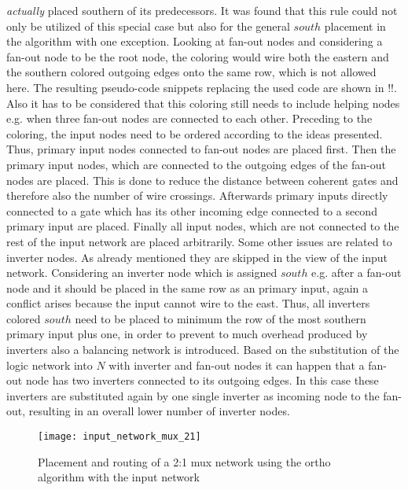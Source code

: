 \textit{actually} placed southern of its predecessors. It was found that this rule could not only be utilized of this special case but also for the general $south$ placement in the algorithm with one exception. Looking at fan-out nodes and considering a fan-out node to be the root node, the coloring would wire both the eastern and the southern colored outgoing edges onto the same row, which is not allowed here. The resulting pseudo-code snippets replacing the used code are shown in !!. Also it has to be considered that this coloring still needs to include helping nodes e.g. when three fan-out nodes are connected to each other. Preceding to the coloring, the input nodes need to be ordered according to the ideas presented. Thus, primary input nodes connected to fan-out nodes are placed first. Then the primary input nodes, which are connected to the outgoing edges of the fan-out nodes are placed. This is done to reduce the distance between coherent gates and therefore also the number of wire crossings. Afterwards primary inputs directly connected to a gate which has its other incoming edge connected to a second primary input are placed. Finally all input nodes, which are not connected to the rest of the input network are placed arbitrarily.
Some other issues are related to inverter nodes. As already mentioned they are skipped in the view of the input network. Considering an inverter node which is assigned $south$ e.g. after a fan-out node and it should be placed in the same row as an primary input, again a conflict arises because the input cannot wire to the east. Thus, all inverters colored $south$ need to be placed to minimum the row of the most southern primary input plus one, in order to prevent to much overhead produced by inverters also a balancing network is introduced. Based on the substitution of the logic network into $N$ with inverter and fan-out nodes it can happen that a fan-out node has two inverters connected to its outgoing edges. In this case these inverters are substituted again by one single inverter as incoming node to the fan-out, resulting in an overall lower number of inverter nodes.

\begin{figure}
	\centering
	\texttt{[image: input\_network\_mux\_21]}
	\caption{Placement and routing of a 2:1 mux network using the ortho algorithm with the input network}\label{fig:input_network_mux_21}
\end{figure}

